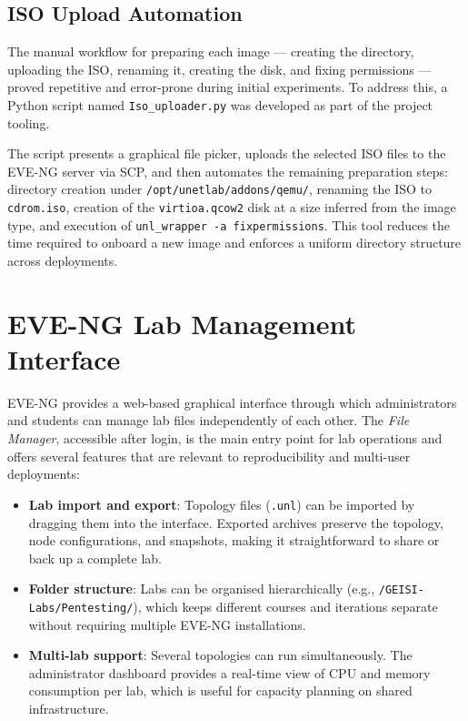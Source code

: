 \subsection{ISO Upload Automation}

The manual workflow for preparing each image --- creating the directory, uploading
the ISO, renaming it, creating the disk, and fixing permissions --- proved repetitive
and error-prone during initial experiments. To address this, a Python script named
\texttt{Iso\_uploader.py} was developed as part of the project tooling.

The script presents a graphical file picker, uploads the selected ISO files to the
EVE-NG server via SCP, and then automates the remaining preparation steps: directory
creation under \texttt{/opt/unetlab/addons/qemu/}, renaming the ISO to
\texttt{cdrom.iso}, creation of the \texttt{virtioa.qcow2} disk at a size inferred
from the image type, and execution of \texttt{unl\_wrapper -a fixpermissions}. This
tool reduces the time required to onboard a new image and enforces a uniform
directory structure across deployments.


\section{EVE-NG Lab Management Interface}

EVE-NG provides a web-based graphical interface through which administrators and
students can manage lab files independently of each other. The \textit{File Manager},
accessible after login, is the main entry point for lab operations and offers several
features that are relevant to reproducibility and multi-user deployments:

\begin{itemize}
    \item \textbf{Lab import and export}: Topology files (\texttt{.unl}) can be
          imported by dragging them into the interface. Exported archives preserve
          the topology, node configurations, and snapshots, making it straightforward
          to share or back up a complete lab.
    \item \textbf{Folder structure}: Labs can be organised hierarchically
          (e.g., \texttt{/GEISI-Labs/Pentesting/}), which keeps different courses
          and iterations separate without requiring multiple EVE-NG installations.
    \item \textbf{Multi-lab support}: Several topologies can run simultaneously.
          The administrator dashboard provides a real-time view of CPU and memory
          consumption per lab, which is useful for capacity planning on shared
          infrastructure.
\end{itemize}


